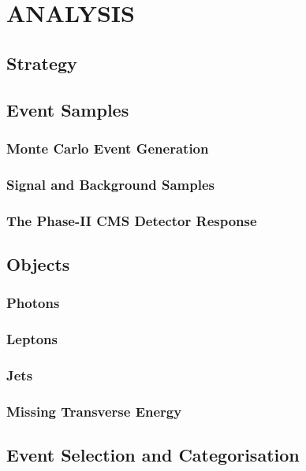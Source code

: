 \chapter{ANALYSIS}\label{ch:Ch3}

\section{Strategy}

\section{Event Samples}

\subsection{Monte Carlo Event Generation}

\subsection{Signal and Background Samples}

\subsection{The Phase-II CMS Detector Response}

\section{Objects}

\subsection{Photons}

\subsection{Leptons}

\subsection{Jets}

\subsection{Missing Transverse Energy}

\section{Event Selection and Categorisation}

